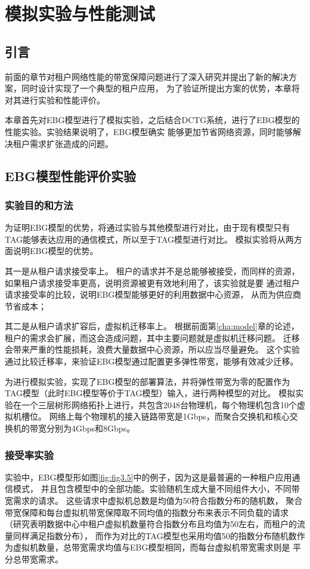 

\chapter{模拟实验与性能测试}
\label{simu}
\section{引言}
前面的章节对租户网络性能的带宽保障问题进行了深入研究并提出了新的解决方案，同时设计实现了一个典型的租户应用，
为了验证所提出方案的优势，本章将对其进行实验和性能评价。

本章首先对EBG模型进行了模拟实验，之后结合DCTG系统，进行了EBG模型的性能实验。实验结果说明了，EBG模型确实
能够更加节省网络资源，同时能够解决租户需求扩张造成的问题。

\section{EBG模型性能评价实验}
\subsection{实验目的和方法}
为证明EBG模型的优势，将通过实验与其他模型进行对比，由于现有模型只有TAG能够表达应用的通信模式，所以至于TAG模型进行对比。
模拟实验将从两方面说明EBG模型的优势。

其一是从租户请求接受率上。
租户的请求并不是总能够被接受，而同样的资源，如果租户请求接受率更高，说明资源被更有效地利用了，该实验就是要
通过租户请求接受率的比较，说明EBG模型能够更好的利用数据中心资源，
从而为供应商节省成本；

其二是从租户请求扩容后，虚拟机迁移率上。
根据前面第\ref{cha:model}章的论述，租户的需求会扩展，而这会造成问题，其中主要问题就是虚拟机迁移问题。
迁移会带来严重的性能损耗，浪费大量数据中心资源，所以应当尽量避免。
这个实验通过比较迁移率，来验证EBG模型通过配置更多弹性带宽，能够有效减少迁移。

为进行模拟实验，实现了EBG模型的部署算法，并将弹性带宽为零的配置作为TAG模型（此时EBG模型等价于TAG模型）输入，进行两种模型的对比。
模拟实验在一个三层树形网络拓扑上进行，共包含2048台物理机，每个物理机包含10个虚拟机槽位。
网络上每个物理机的接入链路带宽是1Gbps，而聚合交换机和核心交换机的带宽分别为4Gbps和8Gbps。

\subsection{接受率实验}
实验中，EBG模型形如图\ref{fig:fig3.5}中的例子，因为这是最普遍的一种租户应用通信模式，
并且包含模型中的全部功能。实验随机生成大量不同组件大小，不同带宽需求的请求。
这些请求中虚拟机总数是均值为50符合指数分布的随机数，
聚合带宽保障和每台虚拟机带宽保障取不同均值的指数分布来表示不同负载的请求
（研究表明数据中心中租户虚拟机数量符合指数分布且均值为50左右，而租户的流量同样满足指数分布\cite{shieh2011sharing}），
而作为对比的TAG模型也采用均值50的指数分布随机数作为虚拟机数量，总带宽需求均值与EBG模型相同，而每台虚拟机带宽需求则是
平分总带宽需求。

